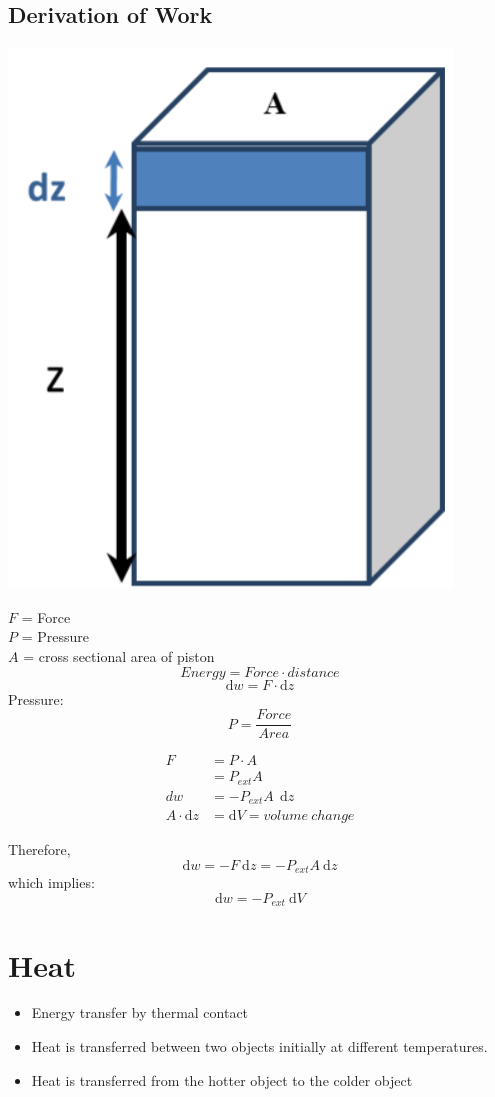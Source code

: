 \documentclass[10pt]{article}
\begin{document}
\subsection*{Derivation of Work}
\begin{center}
\includegraphics*[scale=0.5]{W3_5.png}
\end{center}
$F$ = Force\\
$P$ = Pressure\\
$A$ = cross sectional area of piston\\
\[Energy = Force \cdot distance\]
\[\text{d}w = F \cdot \text{d}z\]
Pressure:
\[P = \frac{Force}{Area}\]
\begin{center}
\begin{align*}
    F &= P \cdot A\\
    &= P_{ext}A\\
    dw &= -P_{ext}A\:\:\text{d}z\\
    A \cdot \text{d}z &= \text{d}V = volume\:change
\end{align*}
\end{center}
Therefore,
\[\text{d}w = -F \:\text{d}z = -P_{ext}A \:\text{d}z\]
which implies:
\[\text{d}w = -P_{ext} \:\text{d}V\]
\section*{Heat}
\begin{itemize}
    \item Energy transfer by thermal contact
    \item Heat is transferred between two objects initially at different temperatures.  
    \item Heat is transferred from the hotter object to the colder object
\end{itemize}
\end{document}

